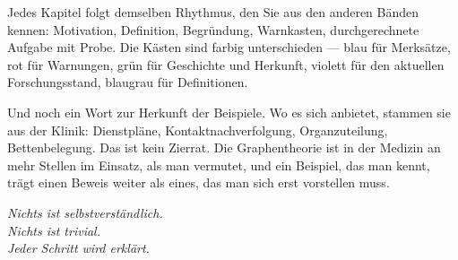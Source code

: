 Jedes Kapitel folgt demselben Rhythmus, den Sie aus den anderen Bänden kennen: Motivation, Definition, Begründung, Warnkasten, durchgerechnete Aufgabe mit Probe. Die Kästen sind farbig unterschieden --- blau für Merksätze, rot für Warnungen, grün für Geschichte und Herkunft, violett für den aktuellen Forschungsstand, blaugrau für Definitionen.

Und noch ein Wort zur Herkunft der Beispiele. Wo es sich anbietet, stammen sie aus der Klinik: Dienst\-pläne, Kon\-takt\-nach\-ver\-fol\-gung, Or\-gan\-zu\-tei\-lung, Bet\-ten\-be\-le\-gung. Das ist kein Zierrat. Die Graphentheorie ist in der Medizin an mehr Stellen im Einsatz, als man vermutet, und ein Beispiel, das man kennt, trägt einen Beweis weiter als eines, das man sich erst vorstellen muss.

\vspace{10pt}
\begin{flushright}
\itshape\color{grau}
Nichts ist selbstverständlich.\\
Nichts ist trivial.\\
Jeder Schritt wird erklärt.
\end{flushright}
